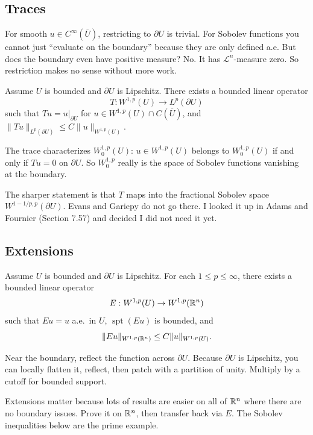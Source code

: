 \subsection{Traces}

For smooth $u \in C^\infty(\overline{U})$, restricting to $\partial U$ is trivial. For Sobolev functions you cannot just ``evaluate on the boundary'' because they are only defined a.e. But does the boundary even have positive measure? No. It has $\mathcal{L}^n$-measure zero. So restriction makes no sense without more work.

\begin{theorem}
\label{thm:trace}
Assume $U$ is bounded and $\partial U$ is Lipschitz. There exists a bounded linear operator
\[
    T : W^{1,p}(U) \to L^p(\partial U)
\]
such that $Tu = u|_{\partial U}$ for $u \in W^{1,p}(U) \cap C(\overline{U})$, and $\|Tu\|_{L^p(\partial U)} \leq C \|u\|_{W^{1,p}(U)}$.
\end{theorem}

The trace characterizes $W^{1,p}_0(U)$: $u \in W^{1,p}(U)$ belongs to $W^{1,p}_0(U)$ if and only if $Tu = 0$ on $\partial U$. So $W^{1,p}_0$ really is the space of Sobolev functions vanishing at the boundary.

The sharper statement is that $T$ maps into the fractional Sobolev space $W^{1-1/p, p}(\partial U)$. Evans and Gariepy do not go there. I looked it up in Adams and Fournier (Section 7.57) and decided I did not need it yet.


\subsection{Extensions}

\begin{theorem}[Extension]
\label{thm:extension}
Assume $U$ is bounded and $\partial U$ is Lipschitz. For each $1 \leq p \leq \infty$, there exists a bounded linear operator
\[
    E : W^{1,p}(U) \to W^{1,p}(\mathbb{R}^n)
\]
such that $Eu = u$ a.e.\ in $U$, $\operatorname{spt}(Eu)$ is bounded, and
\[
    \|Eu\|_{W^{1,p}(\mathbb{R}^n)} \leq C \|u\|_{W^{1,p}(U)}.
\]
\end{theorem}

Near the boundary, reflect the function across $\partial U$. Because $\partial U$ is Lipschitz, you can locally flatten it, reflect, then patch with a partition of unity. Multiply by a cutoff for bounded support.

Extensions matter because lots of results are easier on all of $\mathbb{R}^n$ where there are no boundary issues. Prove it on $\mathbb{R}^n$, then transfer back via $E$. The Sobolev inequalities below are the prime example.


